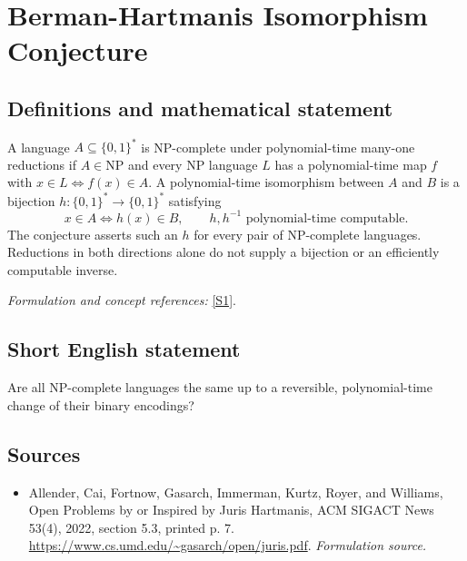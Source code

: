 \documentclass[11pt]{article}
\begin{document}
\section*{\texorpdfstring{Berman-Hartmanis Isomorphism Conjecture}{Berman-Hartmanis Isomorphism Conjecture}}\label{175}
\subsection{Definitions and mathematical statement}
A language $A\subseteq\{0,1\}^*$ is NP-complete under polynomial-time many-one reductions if $A\in\mathrm{NP}$ and every NP language $L$ has a polynomial-time map $f$ with $x\in L\iff f(x)\in A$. A polynomial-time isomorphism between $A$ and $B$ is a bijection $h:\{0,1\}^*\to\{0,1\}^*$ satisfying
\[
 x\in A\iff h(x)\in B,
 \qquad h,h^{-1}\text{ polynomial-time computable}.
\]
The conjecture asserts such an $h$ for every pair of NP-complete languages. Reductions in both directions alone do not supply a bijection or an efficiently computable inverse.
\par\smallskip\textit{Formulation and concept references:} \href{https://www.cs.umd.edu/~gasarch/open/juris.pdf}{[S1]}.

\subsection{Short English statement}
Are all NP-complete languages the same up to a reversible, polynomial-time change of their binary encodings?
\subsection{Sources}
\begin{itemize}
\item[S1]Allender, Cai, Fortnow, Gasarch, Immerman, Kurtz, Royer, and Williams, Open Problems by or Inspired by Juris Hartmanis, ACM SIGACT News 53(4), 2022, section 5.3, printed p. 7.
\url{https://www.cs.umd.edu/~gasarch/open/juris.pdf}.
\textit{Formulation source.}
\end{itemize}
\end{document}
